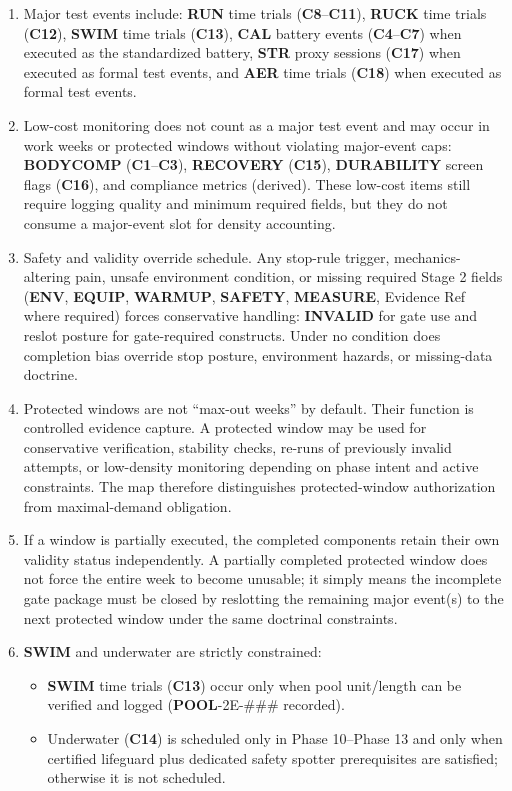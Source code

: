 \documentclass[10pt]{article}
\begin{document}
\begin{enumerate}
\item Major test events include: \textbf{RUN} time trials (\textbf{C8}–\textbf{C11}), \textbf{RUCK} time trials (\textbf{C12}), \textbf{SWIM} time trials (\textbf{C13}), \textbf{CAL} battery events (\textbf{C4}–\textbf{C7}) when executed as the standardized battery, \textbf{STR} proxy sessions (\textbf{C17}) when executed as formal test events, and \textbf{AER} time trials (\textbf{C18}) when executed as formal test events.

\item Low-cost monitoring does not count as a major test event and may occur in work weeks or protected windows without violating major-event caps: \textbf{BODYCOMP} (\textbf{C1}–\textbf{C3}), \textbf{RECOVERY} (\textbf{C15}), \textbf{DURABILITY} screen flags (\textbf{C16}), and compliance metrics (derived). These low-cost items still require logging quality and minimum required fields, but they do not consume a major-event slot for density accounting.

\item Safety and validity override schedule. Any stop-rule trigger, mechanics-altering pain, unsafe environment condition, or missing required Stage 2 fields (\textbf{ENV}, \textbf{EQUIP}, \textbf{WARMUP}, \textbf{SAFETY}, \textbf{MEASURE}, Evidence Ref where required) forces conservative handling: \textbf{INVALID} for gate use and reslot posture for gate-required constructs. Under no condition does completion bias override stop posture, environment hazards, or missing-data doctrine.

\item Protected windows are not “max-out weeks” by default. Their function is controlled evidence capture. A protected window may be used for conservative verification, stability checks, re-runs of previously invalid attempts, or low-density monitoring depending on phase intent and active constraints. The map therefore distinguishes protected-window authorization from maximal-demand obligation.

\item If a window is partially executed, the completed components retain their own validity status independently. A partially completed protected window does not force the entire week to become unusable; it simply means the incomplete gate package must be closed by reslotting the remaining major event(s) to the next protected window under the same doctrinal constraints.

\item \textbf{SWIM} and underwater are strictly constrained:
\begin{itemize}
\item \textbf{SWIM} time trials (\textbf{C13}) occur only when pool unit/length can be verified and logged (\textbf{POOL}-2E-### recorded).
\item Underwater (\textbf{C14}) is scheduled only in Phase 10–Phase 13 and only when certified lifeguard plus dedicated safety spotter prerequisites are satisfied; otherwise it is not scheduled.
\end{itemize}


\end{enumerate}
\end{document}
